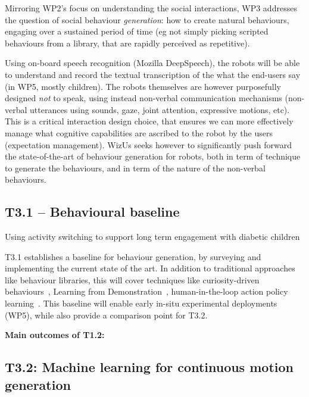 \documentclass[11pt,a4paper]{report}
\newcommand{\project}{WizUs\xspace}
\begin{document}
Mirroring WP2's focus on understanding the social interactions, WP3 addresses the
question of social behaviour \emph{generation}: how to create natural
behaviours, engaging over a sustained period of time (eg not simply picking
scripted behaviours from a library, that are rapidly perceived as repetitive).

Using on-board speech recognition (Mozilla DeepSpeech), the robots will be able to understand and
record the textual transcription of the what the end-users say (in WP5, mostly
children). The robots themselves are however purposefully designed \emph{not} to
speak, using instead non-verbal communication mechanisms (non-verbal utterances
using sounds, gaze, joint attention, expressive motions, etc). This is a
critical interaction design choice, that ensures we can more effectively manage
what cognitive capabilities are ascribed to the robot by the users (expectation
management).  \project seeks however to significantly push forward the
state-of-the-art of behaviour generation for robots, both in term of technique to
generate the behaviours, and in term of the nature of the non-verbal behaviours.


\subsection{T3.1 -- Behavioural baseline}


Using activity switching to support long term engagement with diabetic children~\cite{coninx2016towards}

T3.1 establishes a baseline for behaviour
generation, by surveying and implementing the current state of the art. In
addition to traditional approaches like behaviour libraries, this will cover
techniques like curiosity-driven behaviours~\cite{oudeyer2005playground},
Learning from Demonstration~\cite{billard2008robot, argall2009survey},
human-in-the-loop action policy learning~\cite{senft2016sparc,
senft2019teaching}. This baseline will enable early in-situ experimental
deployments (WP5), while also provide a comparison point for T3.2.


\begin{framed}
    {\bf Main outcomes of T1.2:}
\end{framed}


\subsection{T3.2: Machine learning for continuous motion generation}
\end{document}
